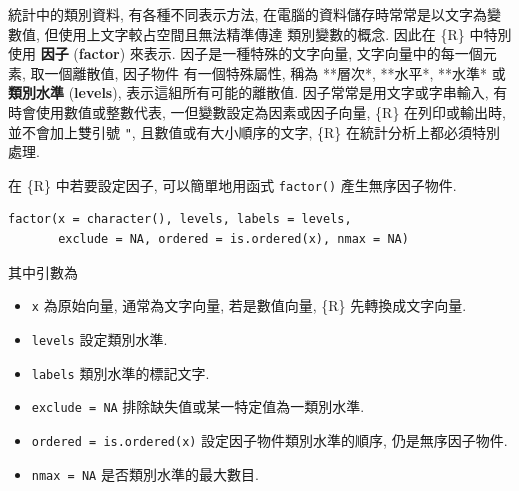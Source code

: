 \documentclass[
]{book}
\providecommand{\tightlist}{%
  \setlength{\itemsep}{0pt}\setlength{\parskip}{0pt}}
\begin{document}
統計中的類別資料,
有各種不同表示方法,
在電腦的資料儲存時常常是以文字為變數值,
但使用上文字較占空間且無法精準傳達
類別變數的概念.
因此在 \{R\} 中特別使用
\textbf{因子}
(\textbf{factor})
來表示.
因子是一種特殊的文字向量,
文字向量中的每一個元素, 取一個離散值,
因子物件 有一個特殊屬性, 稱為
**層次*,
**水平*,
**水準*
或
\textbf{類別水準}
(\textbf{levels}),
表示這組所有可能的離散值.
因子常常是用文字或字串輸入,
有時會使用數值或整數代表,
一但變數設定為因素或因子向量,
\{R\} 在列印或輸出時,
並不會加上雙引號 \texttt{"},
且數值或有大小順序的文字,
\{R\} 在統計分析上都必須特別處理.

在 \{R\} 中若要設定因子,
可以簡單地用函式
\texttt{factor()}
產生無序因子物件.

\begin{verbatim}
factor(x = character(), levels, labels = levels,               
       exclude = NA, ordered = is.ordered(x), nmax = NA)                  
\end{verbatim}

其中引數為

\begin{itemize}
\tightlist
\item
  \texttt{x} 為原始向量, 通常為文字向量, 若是數值向量, \{R\} 先轉換成文字向量.
\item
  \texttt{levels} 設定類別水準.
\item
  \texttt{labels} 類別水準的標記文字.
\item
  \texttt{exclude\ =\ NA} 排除缺失值或某一特定值為一類別水準.
\item
  \texttt{ordered\ =\ is.ordered(x)} 設定因子物件類別水準的順序, 仍是無序因子物件.
\item
  \texttt{nmax\ =\ NA} 是否類別水準的最大數目.
\end{itemize}
\end{document}
